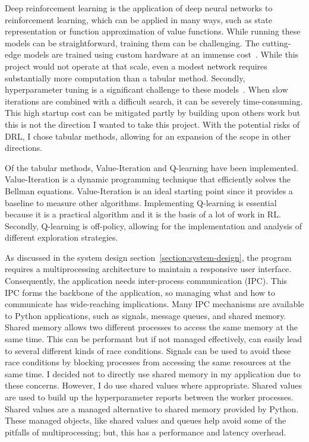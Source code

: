 \documentclass[]{final_report}
\begin{document}
Deep reinforcement learning is the application of deep neural networks to reinforcement learning, which can be applied in many ways, such as state representation or function approximation of value functions. While running these models can be straightforward, training them can be challenging. The cutting-edge models are trained using custom hardware at an immense cost~\cite{DeepRLCost}. While this project would not operate at that scale, even a modest network requires substantially more computation than a tabular method. Secondly, hyperparameter tuning is a significant challenge to these models~\cite{deepRLChallanges}. When slow iterations are combined with a difficult search, it can be severely time-consuming. This high startup cost can be mitigated partly by building upon others work but this is not the direction I wanted to take this project. With the potential risks of DRL, I chose tabular methods, allowing for an expansion of the scope in other directions.

Of the tabular methods, Value-Iteration and Q-learning have been implemented. Value-Iteration is a dynamic programming technique that efficiently solves the Bellman equations. Value-Iteration is an ideal starting point since it provides a baseline to measure other algorithms. Implementing Q-learning is essential because it is a practical algorithm and it is the basis of a lot of work in RL. Secondly, Q-learning is off-policy, allowing for the implementation and analysis of different exploration strategies. 

As discussed in the system design section~\ref{section:system-design}, the program requires a multiprocessing architecture to maintain a responsive user interface. Consequently, the application needs inter-process communication (IPC). This IPC forms the backbone of the application, so managing what and how to communicate has wide-reaching implications. Many IPC mechanisms are available to Python applications, such as signals, message queues, and shared memory. Shared memory allows two different processes to access the same memory at the same time. This can be performant but if not managed effectively, can easily lead to several different kinds of race conditions. Signals can be used to avoid these race conditions by blocking processes from accessing the same resources at the same time. I decided not to directly use shared memory in my application due to these concerns. However, I do use shared values where appropriate. Shared values are used to build up the hyperparameter reports between the worker processes. Shared values are a managed alternative to shared memory provided by Python. These managed objects, like shared values and queues help avoid some of the pitfalls of multiprocessing; but, this has a performance and latency overhead. 
\end{document}
